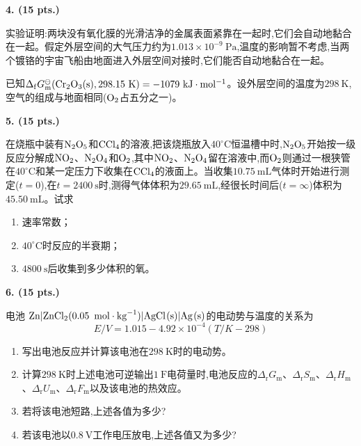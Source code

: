 \vspace{0.5cm}
\noindent\textbf{4. (15 pts.)}

实验证明:两块没有氧化膜的光滑洁净的金属表面紧靠在一起时,它们会自动地黏合在一起。假定外层空间的大气压力约为$1.013\times10^{-9}\ \mathrm{Pa}$,温度的影响暂不考虑,当两个镀铬的宇宙飞船由地面进入外层空间对接时,它们能否自动地黏合在一起。

已知$\Delta_\mathrm{f}G_\mathrm{m}^\ominus(\ce{Cr_{2}O_{3}(s)},298.15\ \mathrm{K})=-1079\ \mathrm{kJ\cdot mol^{-1}}$。设外层空间的温度为$298\ \mathrm{K}$,空气的组成与地面相同($\ce{O_{2}}$占五分之一)。

\vspace{0.5cm}
\noindent\textbf{5. (15 pts.)}

在烧瓶中装有$\ce{N_{2}O_{5}}$和$\ce{CCl_{4}}$的溶液,把该烧瓶放入$40^\circ\mathrm{C}$恒温槽中时,$\ce{N_{2}O_{5}}$开始按一级反应分解成$\ce{NO_{2}}$、$\ce{N_{2}O_{4}}$和$\ce{O_{2}}$,其中$\ce{NO_{2}}$、$\ce{N_{2}O_{4}}$留在溶液中,而$\ce{O_{2}}$则通过一根狭管在$40^\circ\mathrm{C}$和某一定压力下收集在$\ce{CCl_{4}}$的液面上。当收集$10.75\ \mathrm{mL}$气体时开始进行测定($t=0$),在$t=2400\ \mathrm{s}$时,测得气体体积为$29.65\ \mathrm{mL}$,经很长时间后($t=\infty$)体积为$45.50\ \mathrm{mL}$。试求
\begin{enumerate}[label=(\arabic*), itemsep=1ex]
    \item 速率常数；
    \item $40^\circ\mathrm{C}$时反应的半衰期；
    \item $4800\ \mathrm{s}$后收集到多少体积的氧。
\end{enumerate}

\vspace{0.5cm}
\noindent\textbf{6. (15 pts.)}

电池 $\ce{Zn|ZnCl_{2}(0.05\ mol\cdot kg^{-1})}|\ce{AgCl(s)}|\ce{Ag(s)}$的电动势与温度的关系为
\[
E/V=1.015-4.92\times10^{-4}(T/K-298)
\]
\begin{enumerate}[label=(\arabic*), itemsep=1ex]
    \item 写出电池反应并计算该电池在$298\ \mathrm{K}$时的电动势。
    \item 计算$298\ \mathrm{K}$时上述电池可逆输出$1\ \mathrm{F}$电荷量时,电池反应的$\Delta_\mathrm{r}G_\mathrm{m}$、$\Delta_\mathrm{r}S_\mathrm{m}$、$\Delta_\mathrm{r}H_\mathrm{m}$、$\Delta_\mathrm{r}U_\mathrm{m}$、$\Delta_\mathrm{r}F_\mathrm{m}$以及该电池的热效应。
    \item 若将该电池短路,上述各值为多少?
    \item 若该电池以$0.8\ \mathrm{V}$工作电压放电,上述各值又为多少?
\end{enumerate}